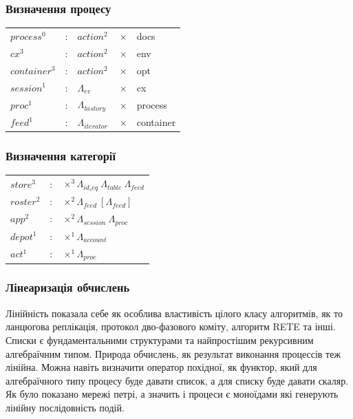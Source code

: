 \documentclass[11pt,oneside]{article}
\begin{document}
  \subsubsection*{Визначення процесу}

\begin{center}
\begin{tabular}{lllll}
       $process^0$ &:& $action^2\ $ &$\times$& docs \\
            $cx^3$ &:& $action^2\ $ &$\times$& env \\
     $container^3$ &:& $action^2\ $ &$\times$& opt \\
       $session^1$ &:& $\Lambda_{ev}$      &$\times$& cx \\
          $proc^1$ &:& $\Lambda_{history}$ &$\times$& process \\
          $feed^1$ &:& $\Lambda_{iterator}$&$\times$& container\\
\end{tabular}
\end{center}

  \subsubsection*{Визначення категорії}

\begin{center}
\begin{tabular}{lll}
           $store^3$ &:& $\times^3 \Lambda_{id_seq}\ \Lambda_{table}\ \Lambda_{feed}$ \\
          $roster^2$ &:& $\times^2 \Lambda_{feed}\ [ \Lambda_{feed} ]$ \\
             $app^2$ &:& $\times^2 \Lambda_{session}\ \Lambda_{proc}$ \\
           $depot^1$ &:& $\times^1 \Lambda_{account}$ \\
             $act^1$ &:& $\times^1 \Lambda_{proc}$ \\
\end{tabular}
\end{center}

\newpage
  \subsubsection*{Лінеаризація обчислень}

   Лінійність показала себе як особлива властивість цілого класу алгоритмів, як то
   ланцюгова реплікація, протокол дво-фазового коміту, алгоритм RETE та інші. Списки
   є фундаментальними структурами та найпростішим рекурсивним алгебраїчним типом.
   Природа обчислень, як результат виконання процессів теж лінійна. Можна навіть визначити
   оператор похідної, як функтор, який для алгебраїчного типу процесу буде давати список,
   а для списку буде давати скаляр. Як було показано \cite{meseguer} мережі петрі,
   а значить і процеси є моноїдами які генерують лінійну послідовність подій.
\end{document}
